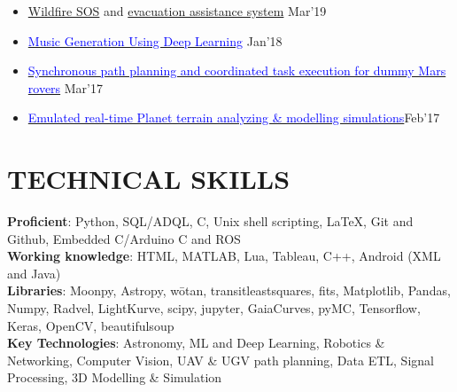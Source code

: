 \documentclass[11pt]{res} %
\newcommand{\sectgap}{0.05in} %
\begin{document}
\begin{resume}
\begin{itemize}
    \item
    \textcolor{blue}{\href{https://github.com/Future-Gadgets-Lab/FOS-Fire-SOS-System}{Wildfire SOS}} and \textcolor{blue}{\href{https://github.com/chetanchawla/Future-Gadget-Labs-HINT}{evacuation assistance system}} \hfill Mar'19
    
    \item
    \href{https://github.com/chetanchawla/Deep-Learning-for-Music-Generation}{\textcolor{blue}{Music Generation Using Deep Learning}} \hfill Jan'18
    \item
    \href{https://github.com/chetanchawla/eYantra-2016-Bothoven}{\textcolor{blue}{Synchronous path planning and coordinated task execution for dummy Mars rovers}} \hfill Mar'17
    \item
    \href{https://github.com/chetanchawla/Blender-Models}{\textcolor{blue}{Emulated real-time Planet terrain analyzing \& modelling simulations}}\hfill Feb'17
\end{itemize}
\vspace{\sectgap} 
\hline


\section{TECHNICAL SKILLS}

\vspace{0.1in} 

\textbf{Proficient}: Python, SQL/ADQL, C, Unix shell scripting, \LaTeX, Git and Github, Embedded C/Arduino C and ROS\vspace{0.05in}\\
\textbf{Working knowledge}: HTML, MATLAB, Lua, Tableau, C++, Android (XML and Java)
\vspace{0.05in}\\
\textbf{Libraries}: Moonpy, Astropy, wōtan, transitleastsquares, fits, Matplotlib, Pandas, Numpy, Radvel, LightKurve, scipy, jupyter, GaiaCurves, pyMC, Tensorflow, Keras, OpenCV, beautifulsoup
\vspace{0.05in}\\
\textbf{Key Technologies}: Astronomy, ML and Deep Learning,  Robotics \& Networking, Computer Vision, UAV \& UGV path planning, Data ETL, Signal Processing, 3D Modelling \& Simulation


\end{resume}
\end{document}
